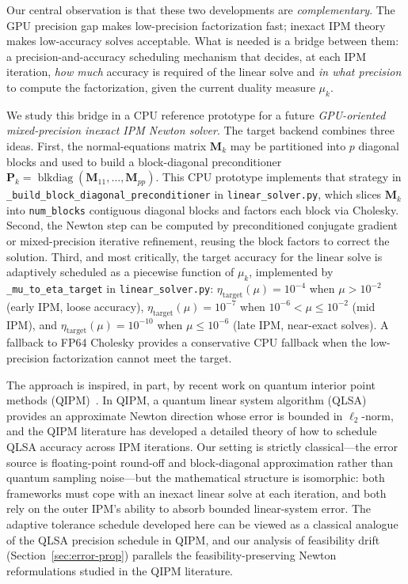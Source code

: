 \documentclass[11pt,twoside]{article}
\newcommand{\bM}{\mathbf{M}}
\newcommand{\bP}{\mathbf{P}}
\newcommand{\blkdiag}{\operatorname{blkdiag}}
\begin{document}
Our central observation is that these two developments are
\emph{complementary}.  The GPU precision gap makes low-precision
factorization fast; inexact IPM theory makes low-accuracy solves
acceptable.  What is needed is a bridge between them: a
precision-and-accuracy scheduling mechanism that decides, at each IPM
iteration, \emph{how much} accuracy is required of the linear solve and
\emph{in what precision} to compute the factorization, given the current
duality measure $\mu_k$.

We study this bridge in a CPU reference prototype for a future
\emph{GPU-oriented mixed-precision inexact IPM Newton solver}.  The target
backend combines three ideas.  First, the normal-equations matrix $\bM_k$
may be partitioned into $p$ diagonal blocks and used to build a
block-diagonal preconditioner
$\bP_k = \blkdiag(\bM_{11},\dots,\bM_{pp})$.  This CPU prototype implements
that strategy in \texttt{\_build\_block\_diagonal\_preconditioner} in
\texttt{linear\_solver.py}, which slices $\bM_k$ into \texttt{num\_blocks}
contiguous diagonal blocks and factors each block via Cholesky.  Second,
the Newton step can be computed by preconditioned conjugate gradient or
mixed-precision iterative refinement, reusing the block factors to correct
the solution.  Third, and most critically, the target accuracy for the
linear solve is adaptively scheduled as a piecewise function of $\mu_k$,
implemented by \texttt{\_mu\_to\_eta\_target} in
\texttt{linear\_solver.py}:
$\eta_{\text{target}}(\mu) = 10^{-4}$ when $\mu > 10^{-2}$ (early IPM, loose
accuracy), $\eta_{\text{target}}(\mu) = 10^{-7}$ when $10^{-6} < \mu \le
10^{-2}$ (mid IPM), and $\eta_{\text{target}}(\mu) = 10^{-10}$ when $\mu \le
10^{-6}$ (late IPM, near-exact solves).  A fallback to FP64 Cholesky
provides a conservative CPU fallback when the low-precision factorization
cannot meet the target.

The approach is inspired, in part, by recent work on quantum interior point
methods (QIPM)~\cite{Kerenidis2020}.  In QIPM, a quantum linear system
algorithm (QLSA) provides an approximate Newton direction whose error is
bounded in $\ell_2$-norm, and the QIPM literature has developed a detailed
theory of how to schedule QLSA accuracy across IPM iterations.  Our setting
is strictly classical---the error source is floating-point round-off and
block-diagonal approximation rather than quantum sampling noise---but the
mathematical structure is isomorphic: both frameworks must cope with an
inexact linear solve at each iteration, and both rely on the outer IPM's
ability to absorb bounded linear-system error.  The adaptive tolerance
schedule developed here can be viewed as a classical analogue of the QLSA
precision schedule in QIPM, and our analysis of feasibility drift
(Section~\ref{sec:error-prop}) parallels the feasibility-preserving
Newton reformulations studied in the QIPM literature.
\end{document}

